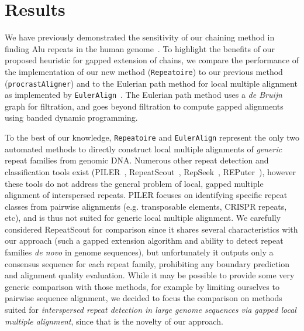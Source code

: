 \documentclass[12pt,journal,letterpaper,onecolumn, draftcls]{IEEEtran}
\begin{document}
\section{Results}
We have previously demonstrated the sensitivity of our chaining method
in finding Alu repeats in the human
genome~\cite{ref-procrast}. To highlight the benefits of our proposed
heuristic for gapped extension of chains, we compare the performance of the implementation of our new method (\texttt{Repeatoire}) to our previous method (\texttt{procrastAligner}) and to the Eulerian path method for local multiple alignment
as implemented by \texttt{EulerAlign}~\cite{ref-related1}. The Eulerian
path method uses a \textit{de Bruijn} graph for filtration, and goes
beyond filtration to compute gapped alignments using banded dynamic
programming.

To the best of our knowledge, \texttt{Repeatoire} and
\texttt{EulerAlign} represent the only two automated methods to directly
construct local multiple alignments of \emph{generic} repeat families from genomic DNA.
Numerous other repeat detection and classification tools exist (PILER~\cite{ref-piler}, RepeatScout~\cite{repeatscout}, RepSeek~\cite{repseek}, REPuter~\cite{ref-reputer}), however these tools do not address the general problem of local, gapped multiple alignment of interspersed repeats.  PILER focuses on identifying specific repeat classes from pairwise alignments (e.g. transposable elements, CRISPR repeats, etc), and is thus not suited for generic local multiple alignment. We carefully considered RepeatScout for comparison since it shares several characteristics with our approach (such a gapped extension algorithm and ability to detect repeat families \emph{de novo} in genome sequences), but unfortunately it outputs only a consensus sequence for each repeat family, prohibiting any boundary prediction and alignment quality evaluation.  While it may be possible to provide some very generic comparison with those methods, for example by limiting ourselves to pairwise sequence alignment, we decided to focus the comparison on methods suited for \emph{interspersed repeat detection in large genome sequences via gapped local multiple alignment}, since that is the novelty of our approach.
\end{document}
